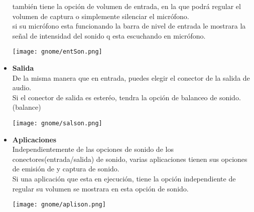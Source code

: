 \begin{itemize}
también tiene la opción de volumen de entrada, en la que podrá regular el volumen de captura o simplemente silenciar el micrófono.\\
si su micrófono esta funcionando la barra de nivel de entrada le mostrara la señal de intensidad del sonido q esta escuchando en micrófono.
\begin{center}
\texttt{[image: gnome/entSon.png]} 
\end{center}
\item{\bf Salida}\\
De la misma manera que en entrada, puedes elegir el conector de la salida de audio.\\
Si el conector de salida es esteréo, tendra la opción de balanceo de sonido.(balance)
\begin{center}
\texttt{[image: gnome/salson.png]} 
\end{center}
\item{\bf Aplicaciones}\\
Independientemente de las opciones de sonido de los conectores(entrada/salida) de sonido, varias aplicaciones tienen sus opciones de emisión de y captura de sonido.\\
Si una aplicación que esta en ejecución, tiene la opción independiente de regular su volumen se mostrara en esta opción de sonido.
\begin{center}
\texttt{[image: gnome/aplison.png]} 
\end{center}
\end{itemize}
